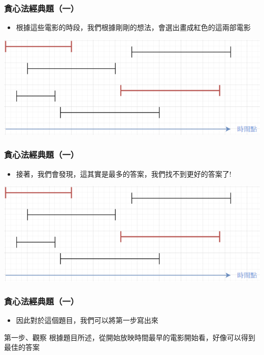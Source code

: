 \documentclass[aspectratio=169]{beamer}
\begin{document}
\begin{frame}
\frametitle{貪心法經典題（一）}
    \begin{itemize}
    \item<1-> 根據這些電影的時段，我們根據剛剛的想法，會選出畫成紅色的這兩部電影
    \end{itemize}
    
    \begin{center}
        \includegraphics[scale=0.75]{images/movie_festival_2.png}
    \end{center}
\end{frame}

\begin{frame}
\frametitle{貪心法經典題（一）}
    \begin{itemize}
    \item<1-> 接著，我們會發現，這其實是最多的答案，我們找不到更好的答案了!
    \end{itemize}
    
    \begin{center}
        \includegraphics[scale=0.75]{images/movie_festival_2.png}
    \end{center}
\end{frame}

\begin{frame}
\frametitle{貪心法經典題（一）}
    \begin{itemize}
    \item<1-> 因此對於這個題目，我們可以將第一步寫出來
    \end{itemize}
    
    \begin{alertblock}{第一步、觀察}
        根據題目所述，從開始放映時間最早的電影開始看，好像可以得到最佳的答案
    \end{alertblock}
\end{frame}
\end{document}
